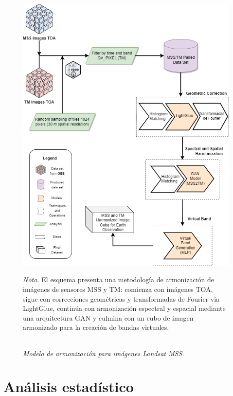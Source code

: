             \begin{figure}[H] 
                \caption{\doublespacing \\ \textit{Modelo de armonización para imágenes Landsat MSS.}} 
                \centering
                \includegraphics[width=0.95\linewidth]{2_CAPITULO5/IMG/modelo.png}
                \begin{justify}
                    \textit{Nota.} El esquema presenta una metodología de armonización de imágenes de sensores MSS y TM: comienza con imágenes TOA, sigue con correcciones geométricas y transformadas de Fourier via LightGlue, continúa con armonización espectral y espacial mediante una arquitectura GAN y culmina con un cubo de imagen armonizado para la creación de bandas virtuales.
                \end{justify}                    
                \label{modelo2}
            \end{figure}

    \section{Análisis estadístico}

